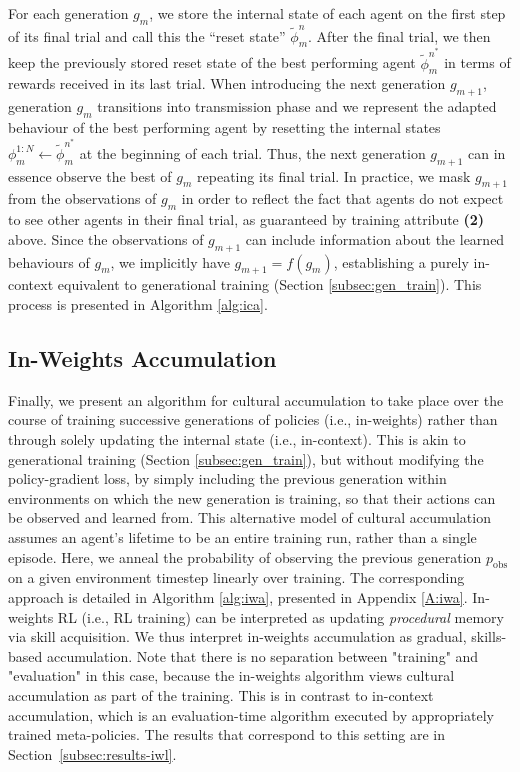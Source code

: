 \documentclass{article}
\begin{document}
For each generation $g_m$, we store the internal state of each agent on the first step of its final trial and call this the ``reset state'' $\tilde{\phi}^n_m$. After the final trial, we then keep the previously stored reset state of the best performing agent $\tilde{\phi}^{n^*}_m$ in terms of rewards received in its last trial. When introducing the next generation $g_{m+1}$, generation $g_m$ transitions into transmission phase and we represent the adapted behaviour of the best performing agent by resetting the internal states $\phi^{1:N}_m \gets \tilde{\phi}^{n^*}_m$ at the beginning of each trial. Thus, the next generation $g_{m+1}$ can in essence observe the best of $g_m$ repeating its final trial. In practice, we mask $g_{m+1}$ from the observations of $g_m$ in order to reflect the fact that agents do not expect to see other agents in their final trial, as guaranteed by training attribute \textbf{(2)} above. Since the observations of $g_{m+1}$ can include information about the learned behaviours of $g_m$, we implicitly have $g_{m+1} = f(g_m)$, establishing a purely in-context equivalent to generational training (Section \ref{subsec:gen_train}). This process is presented in Algorithm \ref{alg:ica}.
\subsection{In-Weights Accumulation}
Finally, we present an algorithm for cultural accumulation to take place over the course of training successive generations of policies (i.e., in-weights) rather than through solely updating the internal state (i.e., in-context). This is akin to generational training (Section \ref{subsec:gen_train}), but without modifying the policy-gradient loss, by simply including the previous generation within environments on which the new generation is training, so that their actions can be observed and learned from. This alternative model of cultural accumulation assumes an agent's lifetime to be an entire training run, rather than a single episode. Here, we anneal the probability of observing the previous generation $p_{\text{obs}}$ on a given environment timestep linearly over training. The corresponding approach is detailed in Algorithm \ref{alg:iwa}, presented in Appendix \ref{A:iwa}. In-weights RL (i.e., RL training) can be interpreted as updating \textit{procedural} memory \citep{johnson2003procedural} via skill acquisition. We thus interpret in-weights accumulation as gradual, skills-based accumulation. Note that there is no separation between "training" and "evaluation" in this case, because the in-weights algorithm views cultural accumulation as part of the training. This is in contrast to in-context accumulation, which is an evaluation-time algorithm executed by appropriately trained meta-policies. The results that correspond to this setting are in Section~\ref{subsec:results-iwl}.
\end{document}

